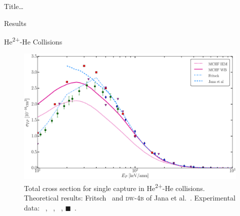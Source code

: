 \documentclass[letterpaper, 11 pt]{report}
\begin{document}
\begin{chapter}{ Title\dots \label{chap:p-he2p-he}}
\begin{section}{Results \label{sec:phe2p-res}}
\begin{subsection}{\texorpdfstring{He\textsuperscript{2+}}{He2+}-He Collisions 
                         \label{sec:he2phe-res}}
         \begin{figure}[t]
            \centering
            \includegraphics[width = 0.95 \linewidth]{./images/he2phe/he2phe-TP.eps}
            \caption[Total cross section for single capture in He\textsuperscript{2+}-He
                     collisions.]{Total cross section for single capture in He\textsuperscript{2+}-He
                     collisions. Theoretical results: Fritsch~\cite{Fritsch-94} and \textsc{dw-4b} of
                     Jana et al.~\cite{JMP-15}.
                     Experimental data: {\color{blue}{$\blacklozenge$}}~\cite{SG85},
                     {\color{OliveGreen}{$\bullet$}}~\cite{SG89},
                     {\color{RedViolet}{$\blacktriangledown$}}~\cite{Dubois87},
                     {\color{red}$\blacksquare$}~\cite{Rudd85}. \label{fig:he2phe-tp}}
         \end{figure}
 

\end{subsection}
\end{section}
\end{chapter}
\end{document}
